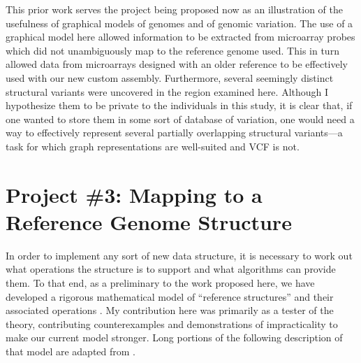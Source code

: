 \documentclass[11pt,proposal]{ucthesis}
\begin{document}
This prior work serves the project being proposed now as an illustration of the usefulness of graphical models of genomes and of genomic variation. The use of a graphical model here allowed information to be extracted from microarray probes which did not unambiguously map to the reference genome used. This in turn allowed data from microarrays designed with an older reference to be effectively used with our new custom assembly. Furthermore, several seemingly distinct structural variants were uncovered in the region examined here. Although I hypothesize them to be private to the individuals in this study, it is clear that, if one wanted to store them in some sort of database of variation, one would need a way to effectively represent several partially overlapping structural variants---a task for which graph representations are well-suited and VCF is not.



    
    
        
    


\section{Project \#3: Mapping to a Reference Genome Structure}

In order to implement any sort of new data structure, it is necessary to work out what operations the structure is to support and what algorithms can provide them. To that end, as a preliminary to the work proposed here, we have developed a rigorous mathematical model of ``reference structures'' and their associated operations \cite{paten2014mapping}. My contribution here was primarily as a tester of the theory, contributing counterexamples and demonstrations of impracticality to make our current model stronger. Long portions of the following description of that model are adapted from \cite{paten2014mapping}. 
\end{document}
